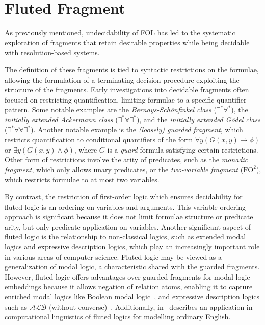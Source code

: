 \chapter{Fluted Fragment}\label{chap:fluted-fragment}

As previously mentioned, undecidability of FOL has led to the systematic exploration of fragments that retain desirable properties while being decidable with resolution-based systems.

The definition of these fragments is tied to syntactic restrictions on the formulae, allowing the formulation of a terminating decision procedure exploiting the structure of the fragments.
Early investigations into decidable fragments often focused on restricting quantification, limiting formulae to a specific quantifier pattern.
Some notable examples are the \emph{Bernays-Schönfinkel class} (\(\exists^*\forall^*\)), the \emph{initially extended Ackermann class} (\(\exists^*\forall\exists^*\)), and the \emph{initially extended Gödel class} (\(\exists^*\forall\forall\exists^*\)).
Another notable example is the \emph{(loosely) guarded fragment}, which restricts quantification to conditional quantifiers of the form \(\forall \bar{y} (G(\bar{x},\bar{y}) \rightarrow \phi)\) or \(\exists \bar{y} (G(\bar{x},\bar{y}) \land \phi)\), where \(G\) is a \emph{guard} formula satisfying certain restrictions.
Other form of restrictions involve the arity of predicates, such as the \emph{monadic fragment}, which only allows unary predicates, or the \emph{two-variable fragment} (\(\text{FO}^2\)), which restricts formulae to at most two variables.

By contrast, the restriction of first-order logic which ensures decidability for fluted logic is an ordering on variables and arguments.
This variable-ordering approach is significant because it does not limit formulae structure or predicate arity, but only predicate application on variables.
Another significant aspect of fluted logic is the relationship to non-classical logics, such as extended modal logics and expressive description logics, which play an increasingly important role in various areas of computer science.
Fluted logic may be viewed as a generalization of modal logic, a characteristic shared with the guarded fragments. 
However, fluted logic offers advantages over guarded fragments for modal logic embeddings because it allows negation of relation atoms, enabling it to capture enriched modal logics like Boolean modal logic~\cite{gargov1990boolean}, and expressive description logics such as \(\mathcal{ALB}\) (without converse)~\cite{hustadt2000issues}.
Additionally, in~\cite{purdy1999quine} \citeauthor{purdy1999quine} describes an application in computational linguistics of fluted logics for
modelling ordinary English.

